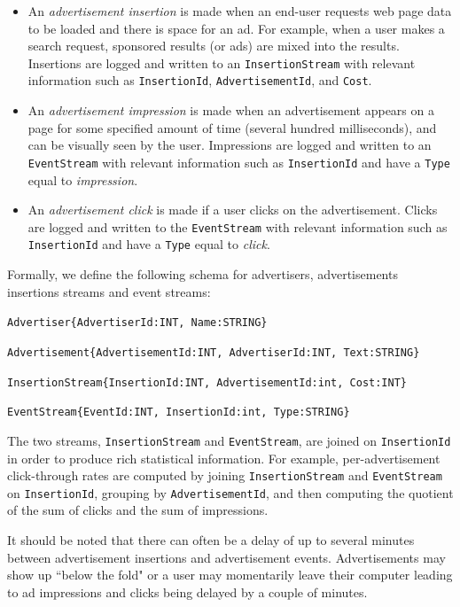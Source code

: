 \documentclass[a4paper, 10pt, conference]{IEEEconf}
\begin{document}
\begin{itemize}

    \item An \textit{advertisement insertion} is made when an end-user requests web page data to be loaded and there is space for an ad. For example, when a user makes a search request, sponsored results (or ads) are mixed into the results.  Insertions are logged and written to an \texttt{InsertionStream} with relevant information such as \texttt{InsertionId}, \texttt{AdvertisementId}, and \texttt{Cost}.

    \item An \textit{advertisement impression} is made when an advertisement appears on a page for some specified amount of time (several hundred milliseconds), and can be visually seen by the user. Impressions are logged and written to an \texttt{EventStream} with relevant information such as \texttt{InsertionId} and have a \texttt{Type} equal to \textit{impression}.

    \item An \textit{advertisement click} is made if a user clicks on the advertisement. Clicks are logged and written to the \texttt{EventStream} with relevant information such as \texttt{InsertionId} and have a \texttt{Type} equal to \textit{click}.

\end{itemize}

Formally, we define the following schema for advertisers, advertisements insertions streams and event streams:

\texttt{Advertiser\{AdvertiserId:INT, Name:STRING\}}

\texttt{Advertisement\{AdvertisementId:INT, AdvertiserId:INT, Text:STRING\}}

\texttt{InsertionStream\{InsertionId:INT, AdvertisementId:int, Cost:INT\}}

\texttt{EventStream\{EventId:INT, InsertionId:int, Type:STRING\}}

The two streams, \texttt{InsertionStream} and \texttt{EventStream}, are joined on \texttt{InsertionId} in order to produce rich statistical information.  For example, per-advertisement click-through rates are computed by joining \texttt{InsertionStream} and \texttt{EventStream} on \texttt{InsertionId}, grouping by \texttt{AdvertisementId}, and then computing the quotient of the sum of clicks and the sum of impressions.

It should be noted that there can often be a delay of up to several minutes between advertisement insertions and advertisement events.  Advertisements may show up ``below the fold" or a user may momentarily leave their computer leading to ad impressions and clicks being delayed by a couple of minutes.
\end{document}
